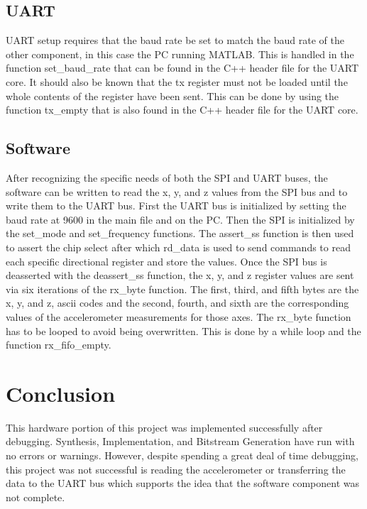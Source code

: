\documentclass{article}
\begin{document}
\subsection{UART}
UART setup requires that the baud rate be set to match the baud rate of the other component, in this case the PC running MATLAB. This is handled in the function set\_baud\_rate that can be found in the C++ header file for the UART core. It should also be known that the tx register must not be loaded until the whole contents of the register have been sent. This can be done by using the function tx\_empty that is also found in the C++ header file for the UART core.

\subsection{Software}
After recognizing the specific needs of both the SPI and UART buses, the software can be written to read the x, y, and z values from the SPI bus and to write them to the UART bus. First the UART bus is initialized by setting the baud rate at 9600 in the main file and on the PC. Then the SPI is initialized by the set\_mode and set\_frequency functions. The assert\_ss function is then used to assert the chip select after which rd\_data is used to send commands to read each specific directional register and store the values. Once the SPI bus is deasserted with the deassert\_ss function, the x, y, and z register values are sent via six iterations of the rx\_byte function. The first, third, and fifth bytes are the x, y, and z, ascii codes and the second, fourth, and sixth are the corresponding values of the accelerometer measurements for those axes. The rx\_byte function has to be looped to avoid being overwritten. This is done by a while loop and the function rx\_fifo\_empty.

\section{Conclusion}
This hardware portion of this project was implemented successfully after debugging. Synthesis, Implementation, and Bitstream Generation have run with no errors or warnings. However, despite spending a great deal of time debugging, this project was not successful is reading the accelerometer or transferring the data to the UART bus which supports the idea that the software component was not complete.  
\end{document}
